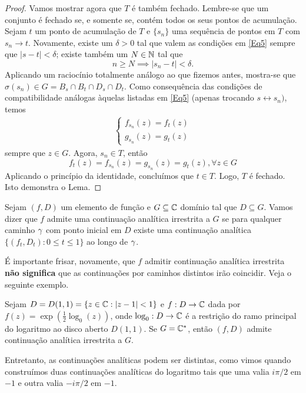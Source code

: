 \begin{proof}
        Vamos mostrar agora que $T$ é também fechado. Lembre-se que um conjunto é fechado 
        se, e somente se, contém todos os seus pontos de acumulação. Sejam $t$ um ponto de
        acumulação de $T$ e $\{s_n\}$ uma sequência de pontos em $T$ com $s_n \to t$. 
        Novamente, existe um $\delta > 0$ tal que valem as condições em \ref{Eq5} sempre que
        $|s-t|<\delta$; existe também um $N \in \mathbb{N}$ tal que
        \begin{equation*}
        n \geq N \implies |s_n - t| < \delta.
        \end{equation*}
        Aplicando um raciocínio totalmente análogo ao que fizemos antes, mostra-se que
        $\sigma(s_n) \in G = B_s \cap B_t \cap D_s \cap D_t$. Como consequência das 
        condições de compatibilidade análogas àquelas listadas em \ref{Eq5} 
        (apenas trocando $s \leftrightarrow s_n)$, temos
        \begin{align*}
            \begin{cases}
                f_{s_n}(z) = f_t(z) \\
                g_{s_n}(z) = g_t(z)
            \end{cases}
        \end{align*}
        sempre que $z \in G$. Agora, $s_n \in T$, então
        \begin{equation*}
            f_t(z) = f_{s_n}(z) = g_{s_n}(z) = g_t(z), \forall z\in G
        \end{equation*}
        Aplicando o princípio da identidade, concluímos que $t \in T$. Logo, $T$ é fechado. 
        Isto demonstra o Lema.
    \end{proof}

    \begin{definicao}
    \label{def-continuacao-irrestrita}
        Sejam $(f,D)$ um elemento de função e $G\subseteq\mathbb{C}$ domínio tal que 
        $D\subseteq G$. Vamos dizer que $f$ admite uma continuação analítica irrestrita a 
        $G$ se para qualquer caminho $\gamma$ com ponto inicial em $D$ existe uma continuação
        analítica $\{(f_t, D_t) : 0\leq t\leq 1\}$ ao longo de $\gamma$.
    \end{definicao}

    É importante frisar, novamente, que $f$ admitir continuação analítica irrestrita 
    \textbf{não significa} que as continuações por caminhos distintos irão coincidir.
    Veja o seguinte exemplo.

    \begin{exemplo}
        Sejam $D = D(1,1) = \{ z\in\mathbb{C} : |z-1|<1 \}$ e $f:D\to\mathbb{C}$ dada por
        $f(z) = \displaystyle{\exp\left( \frac{1}{2}\log_0(z) \right)}$, onde
        $\log_0:D\to\mathbb{C}$ é a restrição do ramo principal do logaritmo ao disco aberto
        $D(1,1)$. Se $G = \mathbb{C}^*$, então $(f,D)$ admite continuação analítica irrestrita
        a $G$.
        
        Entretanto, as continuações analíticas podem ser distintas, como vimos quando
        construímos duas continuações analíticas do logaritmo tais que uma valia 
        $i\pi/2$ em $-1$ e outra valia $-i\pi/2$ em $-1$.
    \end{exemplo}

